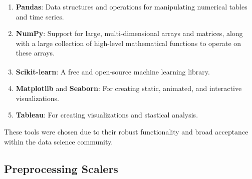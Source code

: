 \documentclass{article}
\theoremstyle{mytheoremstyle}
\theoremstyle{mytheoremstyle}
\theoremstyle{myproblemstyle}
\begin{document}
\begin{enumerate}
    \item \textbf{Pandas}: Data structures and operations for manipulating numerical tables and time series.
    \item \textbf{NumPy}: Support for large, multi-dimensional arrays and matrices, along with a large collection of high-level mathematical functions to operate on these arrays.
    \item \textbf{Scikit-learn}: A free and open-source machine learning library.\textsuperscript{\cite{sklearn}} 
    \item \textbf{Matplotlib} and \textbf{Seaborn}: For creating static, animated, and interactive visualizations.
    \item \textbf{Tableau}: For creating visualizations and stastical analysis.
\end{enumerate}

These tools were chosen due to their robust functionality and broad acceptance within the data science community.
\subsection{Preprocessing Scalers}
\end{document}
